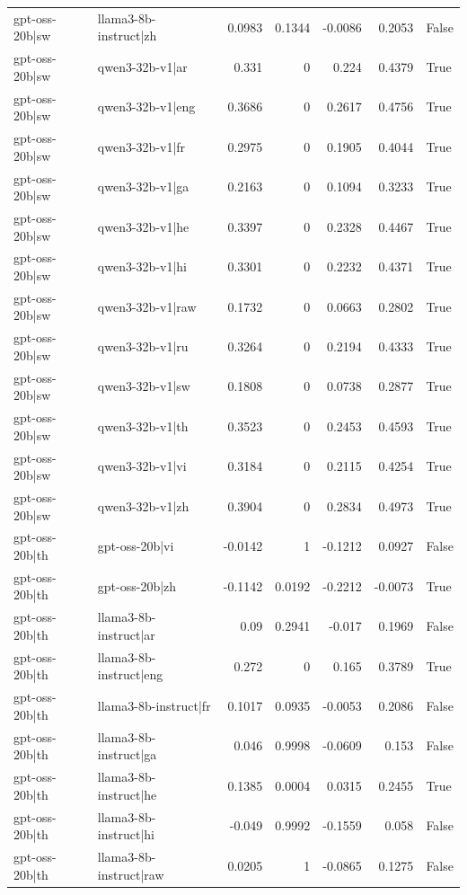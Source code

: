 \begin{table}
\begin{tabular}{l l r r r r l}
gpt-oss-20b|sw & llama3-8b-instruct|zh & 0.0983 & 0.1344 & -0.0086 & 0.2053 & False \\
gpt-oss-20b|sw & qwen3-32b-v1|ar & 0.331 & 0 & 0.224 & 0.4379 & True \\
gpt-oss-20b|sw & qwen3-32b-v1|eng & 0.3686 & 0 & 0.2617 & 0.4756 & True \\
gpt-oss-20b|sw & qwen3-32b-v1|fr & 0.2975 & 0 & 0.1905 & 0.4044 & True \\
gpt-oss-20b|sw & qwen3-32b-v1|ga & 0.2163 & 0 & 0.1094 & 0.3233 & True \\
gpt-oss-20b|sw & qwen3-32b-v1|he & 0.3397 & 0 & 0.2328 & 0.4467 & True \\
gpt-oss-20b|sw & qwen3-32b-v1|hi & 0.3301 & 0 & 0.2232 & 0.4371 & True \\
gpt-oss-20b|sw & qwen3-32b-v1|raw & 0.1732 & 0 & 0.0663 & 0.2802 & True \\
gpt-oss-20b|sw & qwen3-32b-v1|ru & 0.3264 & 0 & 0.2194 & 0.4333 & True \\
gpt-oss-20b|sw & qwen3-32b-v1|sw & 0.1808 & 0 & 0.0738 & 0.2877 & True \\
gpt-oss-20b|sw & qwen3-32b-v1|th & 0.3523 & 0 & 0.2453 & 0.4593 & True \\
gpt-oss-20b|sw & qwen3-32b-v1|vi & 0.3184 & 0 & 0.2115 & 0.4254 & True \\
gpt-oss-20b|sw & qwen3-32b-v1|zh & 0.3904 & 0 & 0.2834 & 0.4973 & True \\
gpt-oss-20b|th & gpt-oss-20b|vi & -0.0142 & 1 & -0.1212 & 0.0927 & False \\
gpt-oss-20b|th & gpt-oss-20b|zh & -0.1142 & 0.0192 & -0.2212 & -0.0073 & True \\
gpt-oss-20b|th & llama3-8b-instruct|ar & 0.09 & 0.2941 & -0.017 & 0.1969 & False \\
gpt-oss-20b|th & llama3-8b-instruct|eng & 0.272 & 0 & 0.165 & 0.3789 & True \\
gpt-oss-20b|th & llama3-8b-instruct|fr & 0.1017 & 0.0935 & -0.0053 & 0.2086 & False \\
gpt-oss-20b|th & llama3-8b-instruct|ga & 0.046 & 0.9998 & -0.0609 & 0.153 & False \\
gpt-oss-20b|th & llama3-8b-instruct|he & 0.1385 & 0.0004 & 0.0315 & 0.2455 & True \\
gpt-oss-20b|th & llama3-8b-instruct|hi & -0.049 & 0.9992 & -0.1559 & 0.058 & False \\
gpt-oss-20b|th & llama3-8b-instruct|raw & 0.0205 & 1 & -0.0865 & 0.1275 & False \\

\end{tabular}
\end{table}
